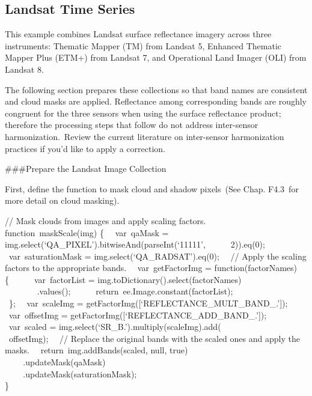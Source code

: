 \documentclass[
  letterpaper,
  DIV=11,
  numbers=noendperiod]{scrreprt}
\begin{document}
\hypertarget{landsat-time-series}{%
\subsection{Landsat Time Series}\label{landsat-time-series}}

This example combines Landsat surface reflectance imagery across three
instruments: Thematic Mapper (TM) from Landsat 5, Enhanced Thematic
Mapper Plus (ETM+) from Landsat 7, and Operational Land Imager (OLI)
from Landsat 8.

The following section prepares these collections so that band names are
consistent and cloud masks are applied. Reflectance among corresponding
bands are roughly congruent for the three sensors when using the surface
reflectance product; therefore the processing steps that follow do not
address inter-sensor harmonization.~Review the current literature on
inter-sensor harmonization practices if you'd like to apply a
correction.

\#\#\#Prepare the Landsat Image Collection

First, define the function to mask cloud and shadow pixels~(See Chap.
F4.3~for more detail on cloud masking).

// Mask clouds from images and apply scaling factors.\\
function~maskScale(img) \{~ ~var~qaMask =
img.select(`QA\_PIXEL').bitwiseAnd(parseInt(`11111',~ ~ ~ ~2)).eq(0);~
~var~saturationMask = img.select(`QA\_RADSAT').eq(0);~ ~// Apply the
scaling factors to the appropriate bands.~ ~var~getFactorImg =
function(factorNames) \{~ ~ ~ ~var~factorList =
img.toDictionary().select(factorNames)\\
\hspace*{0.333em} ~ ~ ~ ~ ~.values();~ ~ ~
~return~ee.Image.constant(factorList);\\
\hspace*{0.333em} ~\};~ ~var~scaleImg =
getFactorImg({[}`REFLECTANCE\_MULT\_BAND\_.'{]});~ ~var~offsetImg =
getFactorImg({[}`REFLECTANCE\_ADD\_BAND\_.'{]});~ ~var~scaled =
img.select(`SR\_B.').multiply(scaleImg).add(\\
\hspace*{0.333em} ~offsetImg);~ ~// Replace the original bands with the
scaled ones and apply the masks.~ ~return~img.addBands(scaled, null,
true)\\
\hspace*{0.333em} ~ ~ ~.updateMask(qaMask)\\
\hspace*{0.333em} ~ ~ ~.updateMask(saturationMask);\\
\}
\end{document}
